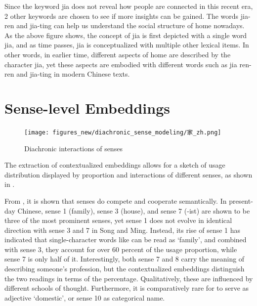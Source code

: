 Since the keyword jia does not reveal how people are connected in this recent era, 2 other keywords are chosen to see if more insights can be gained. The words jia-ren and jia-ting can help us understand the social structure of home nowadays. As the above figure shows, the concept of jia is first depicted with a single word jia, and as time passes, jia is conceptualized with multiple other lexical items. In other words, in earlier time, different aspects of home are described by the character jia, yet these aspects are embodied with different words such as jia ren-ren and jia-ting in modern Chinese texts.



\section{Sense-level Embeddings}

\begin{figure}[H]
  \centering
  \texttt{[image: figures\_new/diachronic\_sense\_modeling/家\_zh.png]}
  \caption{Diachronic interactions of senses}
  \label{fig:jia_polynomial}
\end{figure}

The extraction of contextualized embeddings allows for a sketch of usage distribution displayed by proportion and interactions of different senses, as shown in .

From , it is shown that senses do compete and cooperate semantically. In present-day Chinese, sense 1 (family), sense 3 (house), and sense 7 (-ist) are shown to be three of the most prominent senses, yet sense 1 does not evolve in identical direction with sense 3 and 7 in Song and Ming. Instead, its rise of sense 1 has indicated that single-character words like \jia can be read as `family', and combined with sense 3, they account for over 60 percent of the usage proportion, while sense 7 is only half of it. Interestingly, both sense 7 and 8 carry the meaning of describing someone's profession, but the contextualized embeddings distinguish the two readings in terms of the percentage. Qualitatively, these are influenced by different schools of thought. Furthermore, it is comparatively rare for \jia to serve as adjective `domestic', or sense 10 as categorical name.

